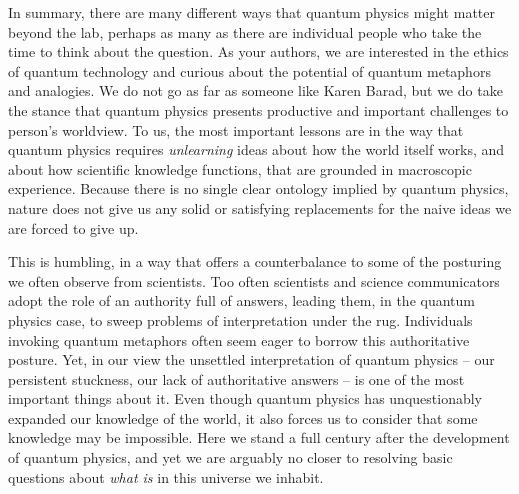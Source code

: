 \documentclass[12pt,onecolumn,preprintnumbers,amsmath,amssymbn,reprint,nofootinbib,superscriptaddress]{revtex4}    %
\begin{document}
In summary, there are many different ways that quantum physics might matter beyond the lab, perhaps as many as there are individual people who take the time to think about the question.  As your authors, we are interested in the ethics of quantum technology and curious about the potential of quantum metaphors and analogies.  We do not go as far as someone like Karen Barad, but we do take the stance that quantum physics presents productive and important challenges to person's worldview.  To us, the most important lessons are in the way that quantum physics requires {\em unlearning} ideas about how the world itself works, and about how scientific knowledge functions, that are grounded in macroscopic experience.  Because there is no single clear ontology implied by quantum physics, nature does not give us any solid or satisfying replacements for the naive ideas we are forced to give up.  

This is humbling, in a way that offers a counterbalance to some of the posturing we often observe from scientists.  Too often scientists and science communicators adopt the role of an authority full of answers, leading them, in the quantum physics case, to sweep problems of interpretation under the rug.  Individuals invoking quantum metaphors often seem eager to borrow this authoritative posture.  Yet, in our view the unsettled interpretation of quantum physics -- our persistent stuckness, our lack of authoritative answers -- is one of the most important things about it.  Even though quantum physics has unquestionably expanded our knowledge of the world, it also forces us to consider that some knowledge may be impossible.  Here we stand a full century after the development of quantum physics, and yet we are arguably no closer to resolving basic questions about {\em what is} in this universe we inhabit.     


\end{document}
